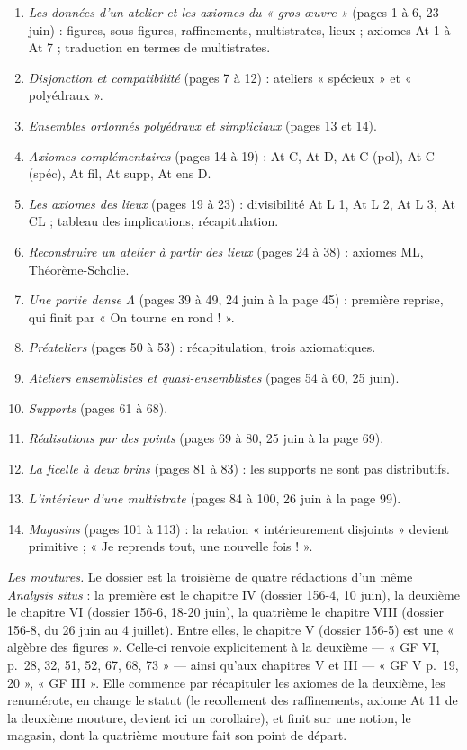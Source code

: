 \documentclass[11pt,a4paper]{article}
\begin{document}
\begin{enumerate}
\item[1.] \emph{Les données d'un atelier et les axiomes du « gros œuvre »}
(pages 1 à 6, 23 juin) : figures, sous-figures, raffinements, multistrates,
lieux ; axiomes At 1 à At 7 ; traduction en termes de multistrates.
\item[2.] \emph{Disjonction et compatibilité} (pages 7 à 12) : ateliers
« spécieux » et « polyédraux ».
\item[3.] \emph{Ensembles ordonnés polyédraux et simpliciaux} (pages 13 et 14).
\item[4.] \emph{Axiomes complémentaires} (pages 14 à 19) : At C, At D, At C
(pol), At C (spéc), At fil, At supp, At ens D.
\item[5.] \emph{Les axiomes des lieux} (pages 19 à 23) : divisibilité At L 1,
At L 2, At L 3, At CL ; tableau des implications, récapitulation.
\item[6.] \emph{Reconstruire un atelier à partir des lieux} (pages 24 à 38) :
axiomes ML, Théorème-Scholie.
\item[7.] \emph{Une partie dense $\Lambda$} (pages 39 à 49, 24 juin à la page
45) : première reprise, qui finit par « On tourne en rond ! ».
\item[8.] \emph{Préateliers} (pages 50 à 53) : récapitulation, trois
axiomatiques.
\item[9.] \emph{Ateliers ensemblistes et quasi-ensemblistes} (pages 54 à 60,
25 juin).
\item[10.] \emph{Supports} (pages 61 à 68).
\item[11.] \emph{Réalisations par des points} (pages 69 à 80, 25 juin à la page
69).
\item[12.] \emph{La ficelle à deux brins} (pages 81 à 83) : les supports ne
sont pas distributifs.
\item[13.] \emph{L'intérieur d'une multistrate} (pages 84 à 100, 26 juin à la
page 99).
\item[14.] \emph{Magasins} (pages 101 à 113) : la relation « intérieurement
disjoints » devient primitive ; « Je reprends tout, une nouvelle fois ! ».
\end{enumerate}

\emph{Les moutures.} Le dossier est la troisième de quatre rédactions d'un même
\emph{Analysis situs} : la première est le chapitre IV (dossier 156-4, 10 juin),
la deuxième le chapitre VI (dossier 156-6, 18-20 juin), la quatrième le
chapitre VIII (dossier 156-8, du 26 juin au 4 juillet). Entre elles, le
chapitre V (dossier 156-5) est une « algèbre des figures ». Celle-ci renvoie
explicitement à la deuxième --- « GF VI, p.~28, 32, 51, 52, 67, 68, 73 » --- ainsi
qu'aux chapitres V et III --- « GF V p.~19, 20 », « GF III ». Elle commence
par récapituler les axiomes de la deuxième, les renumérote, en change le
statut (le recollement des raffinements, axiome At 11 de la deuxième mouture,
devient ici un corollaire), et finit sur une notion, le magasin, dont la
quatrième mouture fait son point de départ.
\end{document}
